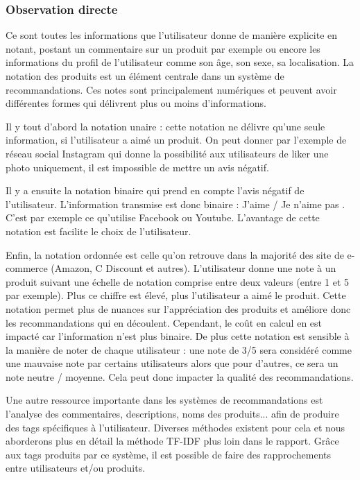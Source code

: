 \subsubsection{Observation directe}
Ce sont toutes les informations que l'utilisateur donne de manière explicite en notant, postant un commentaire sur un produit par exemple ou encore les informations du profil de l'utilisateur comme son âge, son sexe, sa localisation.
La notation des produits est un élément centrale dans un système de recommandations. Ces notes sont principalement numériques et peuvent avoir différentes formes qui délivrent plus ou moins d'informations.
\vspace{0.5cm}
\par Il y tout d'abord la notation unaire : cette notation ne délivre qu'une seule information, si l'utilisateur a aimé un produit. On peut donner par l'exemple de réseau social Instagram qui donne la possibilité aux utilisateurs de \og liker \fg une photo uniquement, il est impossible de mettre un avis négatif.
\par Il y a ensuite la notation binaire  qui prend en compte l'avis négatif de l'utilisateur. L'information transmise est donc binaire : \og J'aime \fg / \og Je n'aime pas \fg . C'est par exemple ce qu'utilise Facebook ou Youtube. L'avantage de cette notation est facilite le choix de l'utilisateur.
\par Enfin, la notation ordonnée est celle qu'on retrouve dans la majorité des site de e-commerce (Amazon, C Discount et autres). L'utilisateur donne une note à un produit suivant une échelle de notation comprise entre deux valeurs (entre 1 et 5 par exemple). Plus ce chiffre est élevé, plus l'utilisateur a aimé le produit. Cette notation permet plus de nuances sur l'appréciation des produits et améliore donc les recommandations qui en découlent.
Cependant, le coût en calcul en est impacté car l'information n'est plus binaire. De plus cette notation est sensible à la manière de noter de chaque utilisateur : une note de 3/5 sera considéré comme une mauvaise note par certains utilisateurs alors que pour d'autres, ce sera un note neutre / moyenne. Cela peut donc impacter la qualité des recommandations.

\vspace{0.5cm}
Une autre ressource importante dans les systèmes de recommandations est l'analyse des commentaires, descriptions, noms des produits... afin de produire des tags spécifiques à l'utilisateur. Diverses méthodes existent pour cela et nous aborderons plus en détail la méthode TF-IDF plus loin dans le rapport. Grâce aux tags produits par ce système, il est possible de faire des rapprochements entre utilisateurs et/ou produits.

